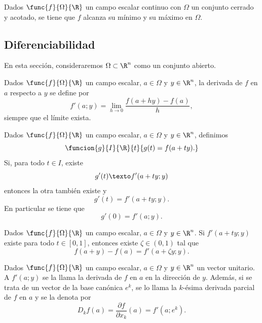 \documentclass[a4,11pt]{aleph-notas}
\begin{document}
\begin{prop}
    Dados $\func{f}{\Omega}{\R}$ un campo escalar continuo con $\Omega$ un conjunto cerrado y acotado, se tiene que $f$ alcanza su mínimo y su máximo en $\Omega$.
\end{prop}

\subsection{Diferenciabilidad}

En esta sección, consideraremos $\Omega\subset \R^n$ como un conjunto abierto.

\begin{defi}
    Dados $\func{f}{\Omega}{\R}$ un campo escalar, $a\in \Omega$ y $y\in \R^n$, la derivada de $f$ en $a$ respecto a $y$ se define por
    \[
        f'(a;y)=\lim_{h\to 0}\frac{f(a+hy)-f(a)}{h},
    \]
    siempre que el límite exista.
\end{defi}

\begin{prop}
    Dados $\func{f}{\Omega}{\R}$ un campo escalar, $a\in \Omega$ y $y\in \R^n$, definimos
    \[
        \funcion{g}{I}{\R}{t}{g(t)=f(a+ty).}
    \]
    Si, para todo $t\in I$, existe
    \[
        g'(t)
        \texto
        f'(a+ty;y)
    \]
    entonces la otra también existe y
    \[
        g'(t)=f'(a+ty;y).
    \]
    En particular se tiene que
    \[
        g'(0)=f'(a;y).
    \]
\end{prop}


\begin{teo}
    Dados $\func{f}{\Omega}{\R}$ un campo escalar, $a\in \Omega$ y $y\in \R^n$. Si $f'(a+ty;y)$ existe para todo $t\in[0,1]$, entonces existe $\zeta\in (0,1)$ tal que
    \[
        f(a+y)-f(a)=f'(a+\zeta y;y).
    \]
\end{teo}

\begin{defi}
    Dados $\func{f}{\Omega}{\R}$ un campo escalar, $a\in \Omega$ y $y\in \R^n$ un vector unitario. A $f'(a;y)$ se la llama la derivada de $f$ en $a$ en la dirección de $y$. Además, si se trata de un vector de la base canónica $e^k$, se lo llama la $k$-ésima derivada parcial de $f$ en $a$ y se la denota por 
    \[
        D_k f(a)=\frac{\partial f}{\partial x_k}(a)=f'(a;e^k).
    \]
\end{defi}
\end{document}
